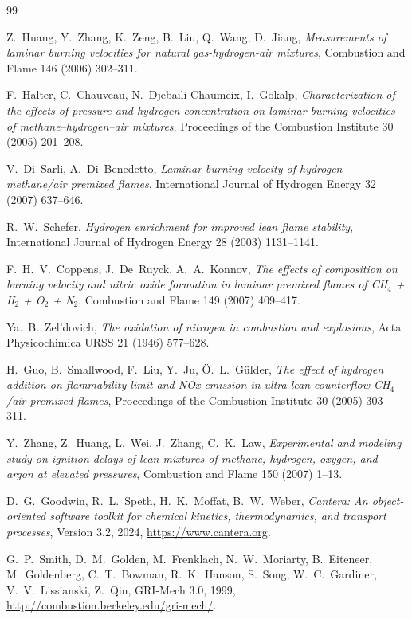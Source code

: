 \documentclass[12pt,a4paper]{article}
\begin{document}
\begin{thebibliography}{99}

  Z.~Huang, Y.~Zhang, K.~Zeng, B.~Liu, Q.~Wang, D.~Jiang,
  \textit{Measurements of laminar burning velocities for natural gas-hydrogen-air
  mixtures},
  Combustion and Flame 146 (2006) 302--311.

  F.~Halter, C.~Chauveau, N.~Djebaili-Chaumeix, I.~Gökalp,
  \textit{Characterization of the effects of pressure and hydrogen concentration
  on laminar burning velocities of methane--hydrogen--air mixtures},
  Proceedings of the Combustion Institute 30 (2005) 201--208.

  V.~Di~Sarli, A.~Di~Benedetto,
  \textit{Laminar burning velocity of hydrogen--methane/air premixed flames},
  International Journal of Hydrogen Energy 32 (2007) 637--646.

  R.~W.~Schefer,
  \textit{Hydrogen enrichment for improved lean flame stability},
  International Journal of Hydrogen Energy 28 (2003) 1131--1141.

  F.~H.~V.~Coppens, J.~De~Ruyck, A.~A.~Konnov,
  \textit{The effects of composition on burning velocity and nitric oxide
  formation in laminar premixed flames of CH$_4$ + H$_2$ + O$_2$ + N$_2$},
  Combustion and Flame 149 (2007) 409--417.

  Ya.~B.~Zel'dovich,
  \textit{The oxidation of nitrogen in combustion and explosions},
  Acta Physicochimica URSS 21 (1946) 577--628.

  H.~Guo, B.~Smallwood, F.~Liu, Y.~Ju, Ö.~L.~Gülder,
  \textit{The effect of hydrogen addition on flammability limit and NOx emission
  in ultra-lean counterflow CH$_4$/air premixed flames},
  Proceedings of the Combustion Institute 30 (2005) 303--311.

  Y.~Zhang, Z.~Huang, L.~Wei, J.~Zhang, C.~K.~Law,
  \textit{Experimental and modeling study on ignition delays of lean mixtures of
  methane, hydrogen, oxygen, and argon at elevated pressures},
  Combustion and Flame 150 (2007) 1--13.

  D.~G.~Goodwin, R.~L.~Speth, H.~K.~Moffat, B.~W.~Weber,
  \textit{Cantera: An object-oriented software toolkit for chemical kinetics,
  thermodynamics, and transport processes},
  Version 3.2, 2024, \url{https://www.cantera.org}.

  G.~P.~Smith, D.~M.~Golden, M.~Frenklach, N.~W.~Moriarty, B.~Eiteneer,
  M.~Goldenberg, C.~T.~Bowman, R.~K.~Hanson, S.~Song, W.~C.~Gardiner,
  V.~V.~Lissianski, Z.~Qin,
  GRI-Mech 3.0, 1999, \url{http://combustion.berkeley.edu/gri-mech/}.

\end{thebibliography}
\end{document}
